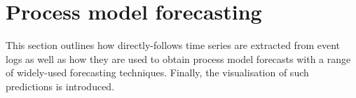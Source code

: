 \section{Process model forecasting}\label{sec:methodology}
This section outlines how directly-follows time series are extracted from event logs as well as how they are used to obtain process model forecasts with a range of widely-used forecasting techniques.
Finally, the visualisation of such predictions is introduced.






